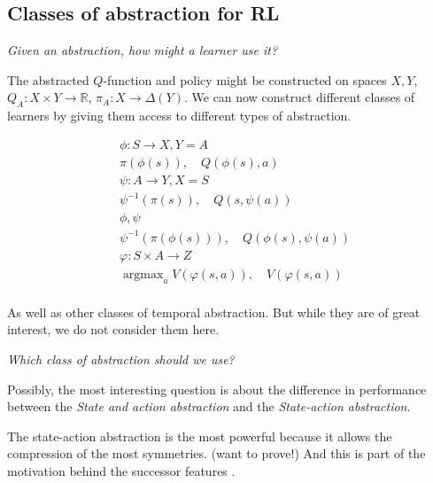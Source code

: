 \subsection{Classes of abstraction for RL}

%

\begin{displayquote}
\textit{Given an abstraction, how might a learner use it?}
\end{displayquote}

The abstracted $Q$-function and policy might be constructed on spaces $X, Y$,
$Q_A: X \times Y \to \mathbb R$, $\pi_A: X \to \Delta(Y)$. We can now construct
different classes of learners by giving them access to different types of abstraction.

\begin{align*}
&\phi: S \to X, Y = A \\
&\pi(\phi(s)),\quad Q(\phi(s), a) \tag{State abstraction} \\
&\psi: A\to Y, X = S\\
&\psi^{-1}(\pi(s)),\quad Q(s, \psi(a)) \tag{Action abstraction} \\
&\phi, \psi\\
&\psi^{-1}(\pi(\phi(s))),\quad Q(\phi(s), \psi(a)) \tag{State and action abstraction} \\
&\varphi: S \times A \to Z \\
&\mathop{\text{argmax}}_a V(\varphi(s, a)),\quad V(\varphi(s, a)) \tag{State-action abstraction} \\
\end{align*}

As well as other classes of temporal abstraction. But while they are of great
interest, we do not consider them here.

\begin{displayquote}
\textit{Which class of abstraction should we use?}
\end{displayquote}

Possibly, the most interesting question is about the difference in performance between
the \textit{State and action abstraction} and the \textit{State-action abstraction}.

The state-action abstraction is the most powerful because it allows the compression of the most symmetries. (want to
prove!) And this is part of the motivation behind the successor features \cite{Barreto2017,Dayan1993}.

